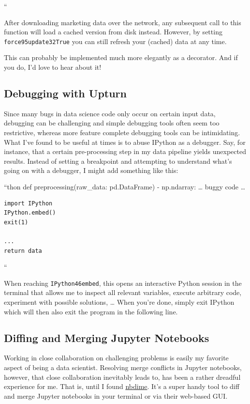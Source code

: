 \documentclass{article}
\begin{document}
``

After downloading marketing data over the network, any subsequent call to this function will load a cached version from disk instead. However, by setting {\colorbox[rgb]{1.00,0.93,1.00}{\tt force\char95update\char32True}} you can still refresh your (cached) data at any time.

This can probably be implemented much more elegantly as a decorator. And if you do, I'd love to hear about it!

\hypertarget{debugging_with_upturn}{}\subsection*{{Debugging with Upturn}}\label{debugging_with_upturn}

Since many bugs in data science code only occur on certain input data, debugging can be challenging and simple debugging tools often seem too restrictive, whereas more feature complete debugging tools can be intimidating. What I've found to be useful at times is to abuse IPython as a debugger. Say, for instance, that a certain pre-processing step in my data pipeline yields unexpected results. Instead of setting a breakpoint and attempting to understand what's going on with a debugger, I might add something like this:

``thon def preprocessing(raw\_data: pd.DataFrame) -{\tt {}} np.ndarray: \ldots{} buggy code \ldots{}

\begin{verbatim}import IPython
IPython.embed()
exit(1)

...
return data\end{verbatim}
``

When reaching {\colorbox[rgb]{1.00,0.93,1.00}{\tt IPython\char46embed}}, this opens an interactive Python session in the terminal that allows me to inspect all relevant variables, execute arbitrary code, experiment with possible solutions, \ldots{} When you're done, simply exit IPython which will then also exit the program in the following line.

\hypertarget{diffing_and_merging_jupyter_notebooks}{}\subsection*{{Diffing and Merging Jupyter Notebooks}}\label{diffing_and_merging_jupyter_notebooks}

Working in close collaboration on challenging problems is easily my favorite aspect of being a data scientist. Resolving merge conflicts in Jupyter notebooks, however, that close collaboration inevitably leads to, has been a rather dreadful experience for me. That is, until I found \href{https://github.com/jupyter/nbdime}{nbdime}. It's a super handy tool to diff and merge Jupyter notebooks in your terminal or via their web-based GUI.
\end{document}
